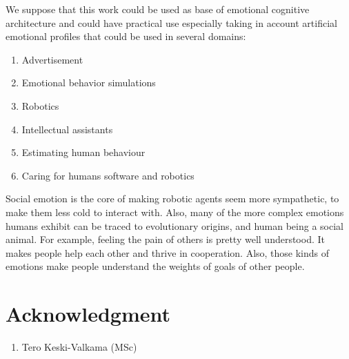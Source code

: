 We suppose that this work could be used as base of emotional cognitive architecture and could have practical use especially taking in account artificial emotional profiles that could be used in several domains:

\begin{enumerate}
 \item  Advertisement
 \item  Emotional behavior simulations
 \item  Robotics
 \item  Intellectual assistants
 \item  Estimating human behaviour
 \item  Caring for humans software and robotics
\end{enumerate}

Social emotion is the core of making robotic agents seem more sympathetic, to make them less cold to interact with.
Also, many of the more complex emotions humans exhibit can be traced to evolutionary origins, and human being a social animal.
For example, feeling the pain of others is pretty well understood. It makes people help each other and thrive in cooperation.
Also, those kinds of emotions make people understand the weights of goals of other people.

\section{Acknowledgment}

\begin{enumerate}
 \item Tero Keski-Valkama (MSc)
\end{enumerate}


